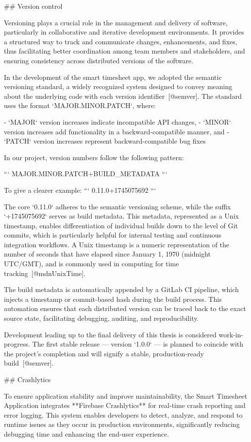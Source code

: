 \documentclass[
  digital,     %
  oneside,     %
  nosansbold,  %
  nocolorbold, %
  lof,         %
  lot,         %
]{fithesis4}
\begin{document}
\begin{markdown}
## Version control

Versioning plays a crucial role in the management and delivery of software, particularly in collaborative and iterative development environments. It provides a structured way to track and communicate changes, enhancements, and fixes, thus facilitating better coordination among team members and stakeholders, and ensuring consistency across distributed versions of the software.

In the development of the smart timesheet app, we adopted the semantic versioning standard, a widely recognized system designed to convey meaning about the underlying code with each version identifier~[@semver]. The standard uses the format `MAJOR.MINOR.PATCH`, where:

- `MAJOR` version increases indicate incompatible API changes,
- `MINOR` version increases add functionality in a backward-compatible manner, and
- `PATCH` version increases represent backward-compatible bug fixes

In our project, version numbers follow the following pattern:

```
MAJOR.MINOR.PATCH+BUILD_METADATA
```

To give a clearer example:
```
0.11.0+1745075692
```

The core `0.11.0` adheres to the semantic versioning scheme, while the suffix `+1745075692` serves as build metadata. This metadata, represented as a Unix timestamp, enables differentiation of individual builds down to the level of Git commits, which is particularly helpful for internal testing and continuous integration workflows. A Unix timestamp is a numeric representation of the number of seconds that have elapsed since January 1, 1970 (midnight UTC/GMT), and is commonly used in computing for time tracking~[@mdnUnixTime].

The build metadata is automatically appended by a GitLab CI pipeline, which injects a timestamp or commit-based hash during the build process. This automation ensures that each distributed version can be traced back to the exact source state, facilitating debugging, auditing, and reproducibility.

Development leading up to the final delivery of this thesis is considered work-in-progress. The first stable release — version `1.0.0` — is planned to coincide with the project's completion and will signify a stable, production-ready build~[@semver].

## Crashlytics

To ensure application stability and improve maintainability, the Smart Timesheet Application integrates **Firebase Crashlytics** for real-time crash reporting and error logging. This system enables developers to detect, analyze, and respond to runtime issues as they occur in production environments, significantly reducing debugging time and enhancing the end-user experience.


\end{markdown}
\end{document}
